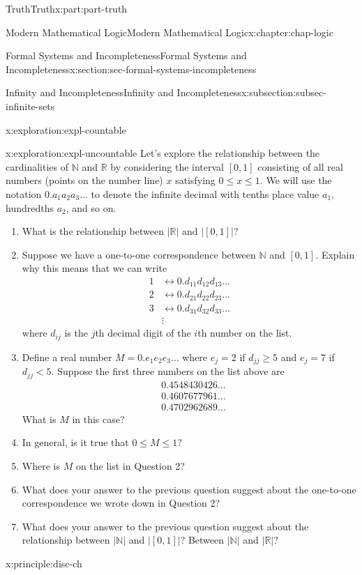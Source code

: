 \documentclass[oneside,10pt,]{book}
\numberwithin{equation}{section}
\renewcommand{\le}{\leqslant}
\renewcommand{\ge}{\geqslant}
\newcommand{\lt}{<}
\newcommand{\amp}{&}
\begin{document}
\begin{partptx}{Truth}{}{Truth}{}{}{x:part:part-truth}
\begin{chapterptx}{Modern Mathematical Logic}{}{Modern Mathematical Logic}{}{}{x:chapter:chap-logic}
\begin{sectionptx}{Formal Systems and Incompleteness}{}{Formal Systems and Incompleteness}{}{}{x:section:sec-formal-systems-incompleteness}
\begin{subsectionptx}{Infinity and Incompleteness}{}{Infinity and Incompleteness}{}{}{x:subsection:subsec-infinite-sets}
\begin{exploration}{}{x:exploration:expl-countable}
\end{exploration}%
\begin{exploration}{}{x:exploration:expl-uncountable}%
Let's explore the relationship between the cardinalities of \(\mathbb{N}\) and \(\mathbb{R}\) by considering the interval \([0,1]\) consisting of all real numbers (points on the number line) \(x\) satisfying \(0 \le x \le 1\). We will use the notation \(0.a_1 a_2 a_3 \ldots\) to denote the infinite decimal with tenths place value \(a_1\), hundredths \(a_2\), and so on.%
%
\begin{enumerate}
\item{}What is the relationship between \(|\mathbb{R}|\) and \(|[0,1]|\)?%
\item{}Suppose we have a one-to-one correspondence between \(\mathbb{N}\) and \([0,1]\). Explain why this means that we can write%
\begin{align*}
1 \amp \leftrightarrow 0.d_{11}d_{12}d_{13}\ldots\\
2 \amp \leftrightarrow 0.d_{21}d_{22}d_{23}\ldots\\
3 \amp \leftrightarrow 0.d_{31}d_{32}d_{33}\ldots\\
\amp \vdots 
\end{align*}
where \(d_{ij}\) is the \(j\)th decimal digit of the \(i\)th number on the list.%
\item{}Define a real number \(M = 0.e_1 e_2 e_3 \ldots\) where \(e_j = 2\) if \(d_{jj} \ge 5\) and \(e_j = 7\) if \(d_{jj} \lt 5\). Suppose the first three numbers on the list above are%
\begin{align*}
\amp 0.4548430426\ldots\\
\amp 0.4607677961\ldots\\
\amp 0.4702962689\ldots
\end{align*}
What is \(M\) in this case?%
\item{}In general, is it true that \(0 \le M \le 1\)?%
\item{}Where is \(M\) on the list in Question 2?%
\item{}What does your answer to the previous question suggest about the one-to-one correspondence we wrote down in Question 2?%
\item{}What does your answer to the previous question suggest about the relationship between \(|\mathbb{N}|\) and \(|[0,1]|\)? Between \(|\mathbb{N}|\) and \(|\mathbb{R}|\)?%
\end{enumerate}
\end{exploration}%
\begin{principle}{}{}{x:principle:disc-ch}%

\end{principle}
\end{subsectionptx}
\end{sectionptx}
\end{chapterptx}
\end{partptx}
\end{document}
